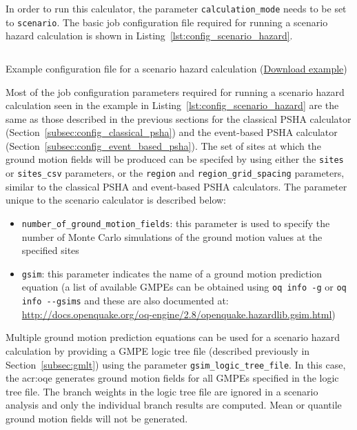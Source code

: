 In order to run this calculator, the parameter \Verb+calculation_mode+ needs
to be set to \Verb+scenario+. The basic job configuration file required for
running a scenario hazard calculation is shown in
Listing~\ref{lst:config_scenario_hazard}.

\begin{listing}[htbp]
  \inputminted[firstline=1,firstnumber=1,fontsize=\footnotesize,frame=single,linenos,bgcolor=lightgray,label=job.ini]{ini}{oqum/hazard/verbatim/config_scenario.ini}
  \caption{Example configuration file for a scenario hazard calculation (\href{https://raw.githubusercontent.com/gem/oq-engine/master/oqum/hazard/verbatim/config_scenario.ini}{Download example})}
  \label{lst:config_scenario_hazard}
\end{listing}

Most of the job configuration parameters required for running a scenario
hazard calculation seen in the example in
Listing~\ref{lst:config_scenario_hazard} are the same as those described in
the previous sections for the classical PSHA calculator
(Section~\ref{subsec:config_classical_psha}) and the event-based PSHA
calculator (Section~\ref{subsec:config_event_based_psha}). The set of sites at
which the ground motion fields will be produced can be specifed by using
either the \Verb+sites+ or \Verb+sites_csv+ parameters, or the \Verb+region+
and \Verb+region_grid_spacing+  parameters, similar to the classical PSHA and
event-based PSHA calculators. The parameter unique to the scenario calculator
is described below:

\begin{itemize}

  \item \Verb+number_of_ground_motion_fields+: this parameter is used to
    specify the number of Monte Carlo simulations of the ground motion
    values at the specified sites

  \item \Verb+gsim+: this parameter indicates the name of a ground motion
  prediction equation (a list of available GMPEs can be obtained using
  \texttt{oq info -g} or \texttt{oq info -{}-gsims} and these are also
  documented at: \href{http://docs.openquake.org/oq-engine/2.8/openquake.hazardlib.gsim.html}{http://docs.openquake.org/oq-engine/2.8/openquake.hazardlib.gsim.html})

\end{itemize}

Multiple ground motion prediction equations can be used for a scenario hazard
calculation by providing a GMPE logic tree file (described previously in 
Section~\ref{subsec:gmlt}) using the parameter \Verb+gsim_logic_tree_file+.
In this case, the \glsdesc{acr:oqe} generates ground motion fields
for all GMPEs specified in the logic tree file. The branch weights in the logic
tree file are ignored in a scenario analysis and only the individual branch
results are computed. Mean or quantile ground motion fields will not be 
generated.

